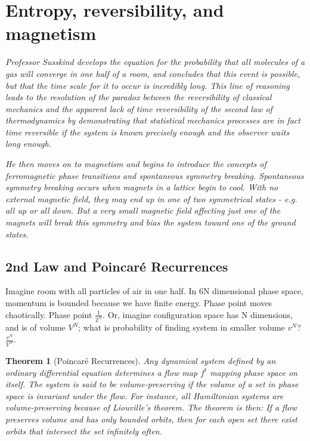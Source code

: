 \documentclass[]{article}
\newtheorem{thm}{Theorem}
\begin{document}
\section{Entropy, reversibility, and magnetism}

\textit{Professor Susskind develops the equation for the probability that all molecules of a gas will converge in one half of a room, and concludes that this event is possible, but that the time scale for it to occur is incredibly long.  This line of reasoning leads to the resolution of the paradox between the reversibility of classical mechanics and the apparent lack of time reversibility of the second law of thermodynamics by demonstrating that statistical mechanics processes are in fact time reversible if the system is known precisely enough and the observer waits long enough.}

\textit{He then moves on to magnetism and begins to introduce the concepts of ferromagnetic phase transitions and spontaneous symmetry breaking.  Spontaneous symmetry breaking occurs when magnets in a lattice begin to cool.  With no external magnetic field, they may end up in one of two symmetrical states - e.g. all up or all down.  But a very small magnetic field affecting just one of the magnets will break this symmetry and bias the system toward one of the ground states.}

\subsection{2nd Law and Poincar\'e Recurrences}

Imagine room with all particles of air in one half. In 6N dimensional phase space, momentum is bounded because we have finite energy. Phase point moves chaotically. Phase point $\frac{1}{2^N}$. Or, imagine configuration space has N dimensions, and is of volume $V^N$; what is probability of finding system in smaller volume $v^N$? $\frac{v^N}{V^N}$. 

\begin{thm}[Poincar\'e Recurrences]
	Any dynamical system defined by an ordinary differential equation determines a flow map $f^t$ mapping phase space on itself. The system is said to be volume-preserving if the volume of a set in phase space is invariant under the flow. For instance, all Hamiltonian systems are volume-preserving because of Liouville's theorem. The theorem is then: If a flow preserves volume and has only bounded orbits, then for each open set there exist orbits that intersect the set infinitely often.
\end{thm}
\end{document}
